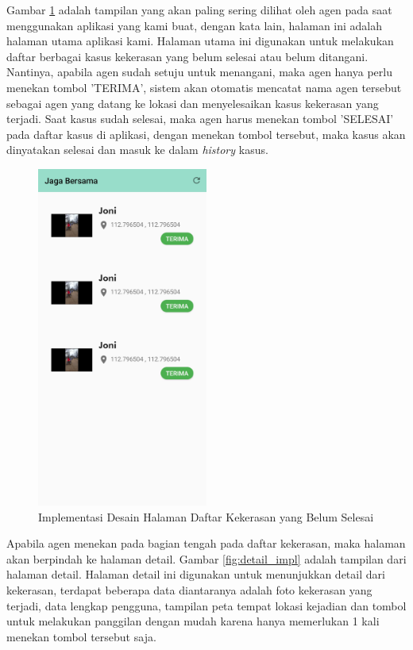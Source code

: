 Gambar \ref{fig:list_impl} adalah tampilan yang akan paling sering dilihat oleh agen pada saat menggunakan aplikasi yang kami buat, dengan kata lain, halaman ini adalah halaman utama aplikasi kami. Halaman utama ini digunakan untuk melakukan daftar berbagai kasus kekerasan yang belum selesai atau belum ditangani. Nantinya, apabila agen sudah setuju untuk menangani, maka agen hanya perlu menekan tombol 'TERIMA', sistem akan otomatis mencatat nama agen tersebut sebagai agen yang datang ke lokasi dan menyelesaikan kasus kekerasan yang terjadi. Saat kasus sudah selesai, maka agen harus menekan tombol 'SELESAI' pada daftar kasus di aplikasi, dengan menekan tombol tersebut, maka kasus akan dinyatakan selesai dan masuk ke dalam \textit{history} kasus.

\begin{figure} [!ht]
  \centering
  \includegraphics[width=0.5\textwidth]{gambar/list.jpeg}
  \caption{Implementasi Desain Halaman Daftar Kekerasan yang Belum Selesai}
  \label{fig:list_impl}
\end{figure}

Apabila agen menekan pada bagian tengah pada daftar kekerasan, maka halaman akan berpindah ke halaman detail. Gambar \ref{fig:detail_impl} adalah tampilan dari halaman detail. Halaman detail ini digunakan untuk menunjukkan detail dari kekerasan, terdapat beberapa data diantaranya adalah foto kekerasan yang terjadi, data lengkap pengguna, tampilan peta tempat lokasi kejadian dan tombol untuk melakukan panggilan dengan mudah karena hanya memerlukan 1 kali menekan tombol tersebut saja.

